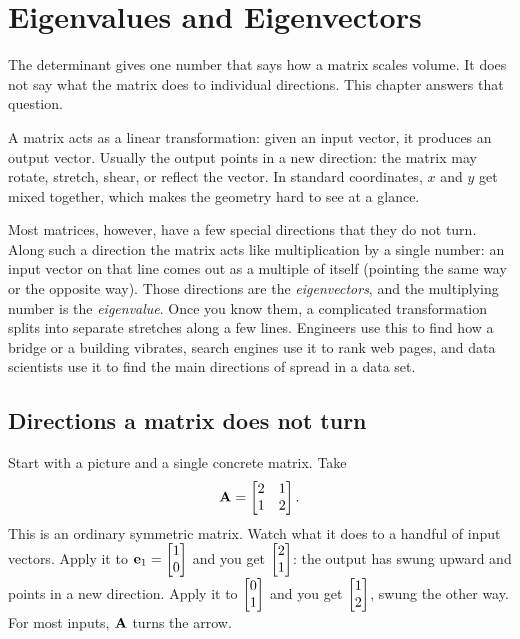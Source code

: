 \chapter{Eigenvalues and Eigenvectors}

The determinant gives one number that says how a matrix scales volume. It does not
say what the matrix does to individual directions. This chapter answers that
question.

A matrix acts as a linear transformation: given an input vector, it produces an
output vector. Usually the output points in a new direction: the matrix may
rotate, stretch, shear, or reflect the vector. In standard coordinates, $x$ and $y$
get mixed together, which makes the geometry hard to see at a glance.

Most matrices, however, have a few special directions that they do not turn.
Along such a direction the matrix acts like multiplication by a single number: an
input vector on that line comes out as a multiple of itself (pointing the same way
or the opposite way). Those directions are the \emph{eigenvectors}, and the
multiplying number is the \emph{eigenvalue}. Once you know them, a complicated
transformation splits into separate stretches along a few lines. Engineers use
this to find how a bridge or a building vibrates, search engines use it to rank web
pages, and data scientists use it to find the main directions of spread in a data
set.

\section{Directions a matrix does not turn}
\label{ch23:directions}

Start with a picture and a single concrete matrix. Take
\[
  \mathbf{A}=\begin{bmatrix} 2 & 1 \\ 1 & 2 \end{bmatrix}.
\]
This is an ordinary symmetric matrix. Watch what it does to a handful of
input vectors. Apply it to $\mathbf{e}_1 = \begin{bmatrix}1\\0\end{bmatrix}$ and you get $\begin{bmatrix}2\\1\end{bmatrix}$:
the output has swung upward and points in a new direction. Apply it to
$\begin{bmatrix}0\\1\end{bmatrix}$ and you get $\begin{bmatrix}1\\2\end{bmatrix}$, swung the other way. For most
inputs, $\mathbf{A}$ turns the arrow.


